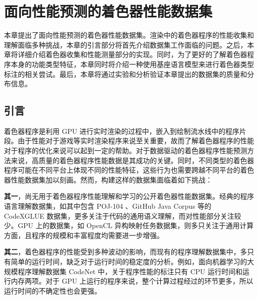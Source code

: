 
\chapter{面向性能预测的着色器性能数据集}
\label{sec:perf_data_set_chap}

{\added 本章提出了面向性能预测的着色器性能数据集。渲染中的着色器程序的性能收集和理解面临多种挑战，本章的引言部分将首先介绍数据集工作面临的问题。之后，本章将详细介绍着色器收集和性能测量部分的实现。同时，为了更好的了解着色器程序本身的功能类型特征，本章同时将介绍一种使用基座语言模型来进行着色器类型标注的相关尝试。最后，本章将通过实验和分析验证本章提出的数据集的质量和分布信息。}

\section{{\amend 引言}}

{\amend 着色器程序是利用 GPU 进行实时渲染的过程中，嵌入到绘制流水线中的程序片段。由于性能对于游戏等实时渲染程序来说至关重要，故而了解着色器程序的性能对于程序的优化来说可以起到一定的帮助。对于数据驱动的着色器程序性能预测方法来说，高质量的着色器程序性能数据是其成功的关键。同时，不同类型的着色器程序可能在不同平台上体现不同的性能特征，这些行为也需要跨越不同平台的着色器性能数据集加以刻画。然而，构建这样的数据集面临着如下挑战：

{\bf 其一}，尚无用于着色器程序性能理解和学习的公开着色器性能数据集。经典的程序语言理解数据集，如其中包含 POJ-104 \cite{10.5555/3015812.3016002}、GitHub Java Corpus 等的 CodeXGLUE 数据集\cite{DBLP:journals/corr/abs-2102-04664}，更多关注于代码的通用语义理解，而对性能部分关注较少。GPU 上的数据集，如 OpenCL 异构映射任务数据集\cite{8091247}，则多只关注于通用计算方面，且程序的规模和丰富程度均需要进一步增强。

{\bf 其二}，着色器程序的性能受到多种波动的影响，而现有的程序理解数据集中，多只有简单的运行时间，缺乏对于运行时间的稳定度的分析。例如，面向机器学习的大规模程序理解数据集 CodeNet \cite{DBLP:journals/corr/abs-2105-12655} 中，关于程序性能的标注只有 CPU 运行时间和运行内存两项。对于 GPU 上运行的程序来说，整个计算过程经过的环节更多，所以运行时间的不确定性也会更强。}

